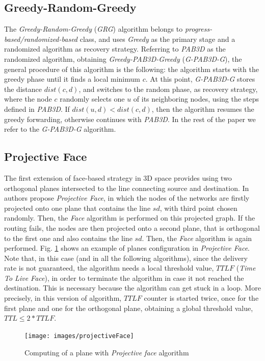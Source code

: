\documentclass[journal,comsoc]{IEEEtran}
\begin{document}
\subsection{Greedy-Random-Greedy}
The \emph{Greedy-Random-Greedy} (\emph{GRG}) algorithm belongs to \emph{progress-based/randomized-based} class, and uses \emph{Greedy} as the primary stage and a randomized algorithm as recovery strategy. Referring to \emph{PAB3D} as the randomized algorithm, obtaining \emph{Greedy-PAB3D-Greedy} (\emph{G-PAB3D-G}), the general procedure of this algorithm is the following: the algorithm starts with the greedy phase until it finds a local minimum \(c\). At this point, \emph{G-PAB3D-G} stores the distance \(dist(c, d)\), and switches to the random phase, as recovery strategy, where the node \(c\) randomly selects one \(u\) of its neighboring nodes, using the steps defined in \emph{PAB3D}. If \(dist(u, d) < dist(c, d)\), then the algorithm resumes the greedy forwarding, otherwise continues with \emph{PAB3D}. In the rest of the paper we refer to the \emph{G-PAB3D-G} algorithm.

\subsection{Projective Face}
The first extension of face-based strategy in 3D space provides using two orthogonal planes intersected to the line connecting source and destination. In \cite{kao:3d} authors propose \emph{Projective Face}, in which the nodes of the networks are firstly projected onto one plane that contains the line \(sd\), with third point chosen randomly. Then, the \emph{Face} algorithm is performed on this projected graph. If the routing fails, the nodes are then projected onto a second plane, that is orthogonal to the first one and also contains the line \(sd\). Then, the \emph{Face} algorithm is again performed. Fig. \ref{fig:projectiveFace} shows an example of planes configuration in \emph{Projective Face}. Note that, in this case (and in all the following algorithms), since the delivery rate is not guaranteed, the algorithm needs a local threshold value, \(TTLF\) (\emph{Time To Live Face}), in order to terminate the algorithm in case it not reached the destination. This is necessary because the algorithm can get stuck in a loop. More precisely, in this version of algorithm, \(TTLF\) counter is started twice, once for the first plane and one for the orthogonal plane, obtaining a global threshold value, \(TTL \leq 2*TTLF\).

\begin{figure}[!t]
\centering
\texttt{[image: images/projectiveFace]}
\caption{Computing of a plane with \emph{Projective face} algorithm}
  \label{fig:projectiveFace}
\end{figure}
\end{document}
